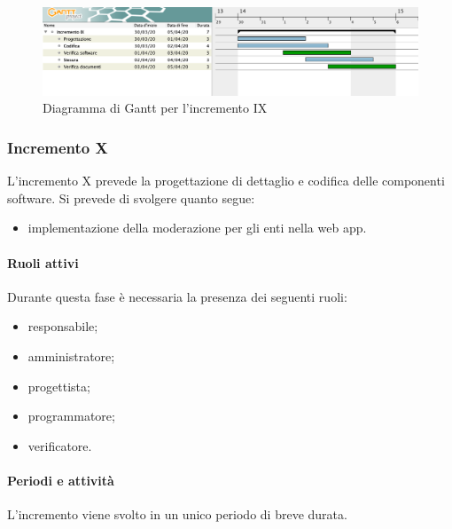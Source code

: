 		\begin{landscape}
          \begin{figure}[H]
            \centering
            \includegraphics[width=\linewidth]{images/gantt/incrementoIX} %
            \caption{Diagramma di Gantt per l'incremento IX}
          \end{figure}		
		\end{landscape}


		\subsubsection{Incremento X}
			
			L'incremento X prevede la progettazione di dettaglio e codifica delle componenti software. Si prevede di svolgere quanto segue:
			\begin{itemize}
				\item implementazione della moderazione per gli enti nella web app.
			\end{itemize}
			
			\paragraph{Ruoli attivi}
			
				Durante questa fase è necessaria la presenza dei seguenti ruoli:
				\begin{itemize}
					\item responsabile;
					\item amministratore;
					\item progettista;
					\item programmatore;
					\item verificatore.
				\end{itemize}
			
			\paragraph{Periodi e attività}
			
				L'incremento viene svolto in un unico periodo di breve durata.
				
